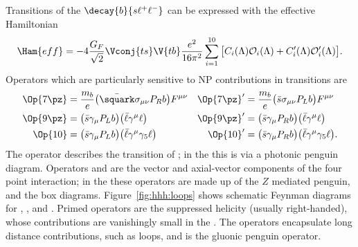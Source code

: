 Transitions of the \fcnc $\decay{b}{s\ell^+\ell^-}$ can be expressed with the effective Hamiltonian
\begin{equation}
  \Ham{eff} = -4\frac{G_F}{\sqrt{2}}\Vconj{ts}\V{tb}\frac{e^2}{16\pi^2}
  \sum_{i=1}^{10}\big[C_i(\Lambda)\mathcal{O}_i(\Lambda)
    +C_i^\prime(\Lambda)\mathcal{O}_i^\prime(\Lambda)\big].
\end{equation}
Operators which are particularly sensitive to NP contributions in  transitions are
\begin{align}
  \Op{7\pz} &= \frac{m_b}{e}\big(\bar\squark\sigma_{\mu\nu}P_Rb\big)F^{\mu\nu}
  &\Op{7\pz}^\prime &= \frac{m_b}{e}\big(\bar s \sigma_{\mu\nu}P_Lb\big)F^{\mu\nu}
  \nonumber\\
  \Op{9\pz} &= \big(\bar s\gamma_\mu P_Lb\big)\big(\bar\ell\gamma^\mu\ell\big)
  &\Op{9\pz}^\prime &= \big(\bar s\gamma_\mu P_Rb\big)\big(\bar\ell\gamma^\mu\ell\big)
  \nonumber\\
  \Op{10} &= \big(\bar s\gamma_\mu P_Lb\big)\big(\bar\ell\gamma^\mu\gamma_5\ell\big)
  &\Op{10}^\prime &= \big(\bar s\gamma_\mu P_Rb\big)\big(\bar\ell\gamma^\mu\gamma_5\ell\big).
\end{align}
The operator  describes the transition of \decay{\bquark}{\squark\gamma}; in the \sm this is
via a photonic penguin diagram.
Operators  and  are the vector and axial-vector components of the four point
\decay{\bquark}{\squark\mumu} interaction; in the \sm these operators are made up of the $Z$
mediated penguin, and the \Wp box diagrams.
Figure~\ref{fig:hhh:loops} shows schematic Feynman diagrams for , , and .
Primed operators are the suppressed helicity (usually right-handed), whose contributions are
vanishingly small in the \sm.
The operators  encapsulate long distance contributions, such as \ccbar
loops, and  is the gluonic penguin operator.

